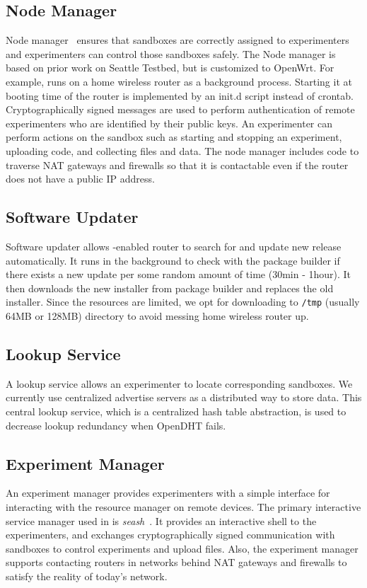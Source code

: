 \subsection{Node Manager}
\label{sec.nodemanager}
Node manager~\cite{nodemanager} ensures that sandboxes are correctly assigned to experimenters and experimenters can control those sandboxes safely. The Node manager is based on prior work on Seattle Testbed, but is customized to OpenWrt. For example, \sysname runs on a home wireless router as a background process. Starting it at booting time of the router is implemented by an init.d script instead of crontab. Cryptographically signed messages are used to perform authentication of remote experimenters who are identified by their public keys. An experimenter can perform actions on the sandbox such as starting and stopping an experiment, uploading code, and collecting files and data. The node manager includes code to traverse NAT gateways and firewalls so that it is contactable even if the router does not have a public IP address. 

\subsection{Software Updater}
\label{sec.softwareupdater}
Software updater allows \sysname-enabled router to search for and update new release automatically. It runs in the background to check with the package builder if there exists a new update per some random amount of time (30min - 1hour). It then downloads the new installer from package builder and replaces the old installer. Since the resources are limited, we opt for downloading to \texttt{/tmp} (usually 64MB or 128MB) directory to avoid messing home wireless router up.   

\subsection{Lookup Service}
\label{sec.lookupservice}
A lookup service allows an experimenter to locate corresponding sandboxes. We currently use centralized advertise servers as a distributed way to store data. This central lookup service, which is a centralized hash table abstraction, is used to decrease lookup redundancy when OpenDHT fails.

\subsection{Experiment Manager}
\label{sec.seash}
An experiment manager provides experimenters with a simple interface for interacting with the resource manager on remote devices. The primary interactive service manager used in \sysname is \textit{seash}~\cite{seash}. It provides an interactive shell to the experimenters, and exchanges cryptographically signed communication with sandboxes to control experiments and upload files. Also, the experiment manager supports contacting routers in networks behind NAT gateways and firewalls to satisfy the reality of today's network.

